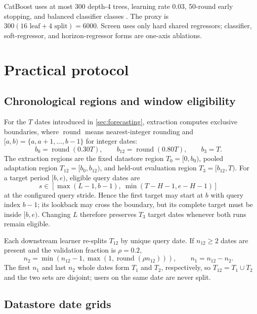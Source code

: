 \documentclass[10pt]{article}
\newcommand{\Tzero}{T_0}
\newcommand{\Tone}{T_1}
\newcommand{\Ttwo}{T_2}
\newcommand{\Tpool}{T_{12}}
\newcommand{\Tthree}{T_3}
\begin{document}
CatBoost uses at most 300 depth-4 trees, learning rate 0.03, 50-round early
stopping, and balanced classifier classes \citep{prokhorenkova2018catboost}.
The proxy is $300(16\text{ leaf}+4\text{ split})=6000$. Screen uses only hard
shared regressors; classifier, soft-regressor, and horizon-regressor forms are
one-axis ablations.

\section{Practical protocol}
\label{sec:practical}

\subsection{Chronological regions and window eligibility}

For the $T$ dates introduced in \cref{sec:forecasting}, extraction computes
exclusive boundaries, where $\operatorname{round}$ means nearest-integer
rounding and $[a,b)=\{a,a+1,\ldots,b-1\}$ for integer dates:
\[
 b_0=\operatorname{round}(0.30T),\qquad
 b_{12}=\operatorname{round}(0.80T),\qquad b_3=T.
\]
The extraction regions are the fixed datastore region $\Tzero=[0,b_0)$,
pooled adaptation region $\Tpool=[b_0,b_{12})$, and held-out evaluation
region $\Tthree=[b_{12},T)$. For a target period
$[b,e)$, eligible query dates are
\[
 s\in
 \left[\max(L-1,b-1),\ \min(T-H-1,e-H-1)\right]
\]
at the configured query stride. Hence the first target may start at $b$ with
query index $b-1$; its lookback may cross the boundary, but its complete target
must be inside $[b,e)$. Changing $L$ therefore preserves $\Tthree$ target dates
whenever both runs remain eligible.

Each downstream learner re-splits $\Tpool$ by unique query date. If
$n_{12}\geq2$ dates are present and the validation fraction is $\rho=0.2$,
\[
 n_2=\min(n_{12}-1,\max(1,\operatorname{round}(\rho n_{12}))),
 \qquad n_1=n_{12}-n_2.
\]
The first $n_1$ and last $n_2$ whole dates form $\Tone$ and $\Ttwo$,
respectively, so $\Tpool=\Tone\cup\Ttwo$ and the two sets are disjoint; users
on the same date are never split.

\subsection{Datastore date grids}
\end{document}
